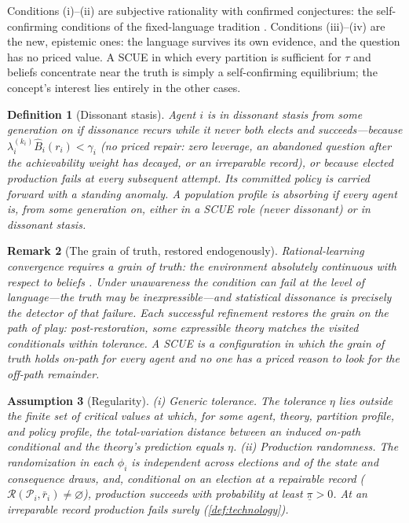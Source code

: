 \documentclass[11pt]{article}
\newtheorem{assumption}{Assumption}[section]
\newtheorem{definition}[assumption]{Definition}
\newtheorem{remark}[assumption]{Remark}
\theoremstyle{definition}
\newcommand{\emptysetset}{\varnothing}
\begin{document}
Conditions (i)--(ii) are subjective rationality with confirmed conjectures:
the self-confirming conditions of the fixed-language tradition
\citep{FudenbergLevine1993,KalaiLehrer1993b}.  Conditions (iii)--(iv) are the
new, epistemic ones: the language survives its own evidence, and the question
has no priced value.  A SCUE in which every partition is sufficient for $\tau$
and beliefs concentrate near the truth is simply a self-confirming
equilibrium; the concept's interest lies entirely in the other cases.

\begin{definition}[Dissonant stasis]
\label{def:stasis}
Agent $i$ is in \emph{dissonant stasis} from some generation on if dissonance
recurs while it never both elects and succeeds---because
$\lambda_i^{(k_i)}\widehat B_i(r_i)<\gamma_i$ (no priced repair: zero leverage,
an abandoned question after the achievability weight has decayed, or an
irreparable record), or because elected production fails at every subsequent
attempt.  Its committed policy is carried forward with a standing anomaly.  A
population profile is \emph{absorbing} if every agent is, from some generation
on, either in a SCUE role (never dissonant) or in dissonant stasis.
\end{definition}

\begin{remark}[The grain of truth, restored endogenously]
\label{rem:grain}
Rational-learning convergence requires a grain of truth: the environment
absolutely continuous with respect to beliefs \citep{KalaiLehrer1993a}.
Under unawareness the condition can fail at the level of language---the
truth may be inexpressible---and statistical dissonance is precisely the
detector of that failure.  Each successful refinement restores the grain
\emph{on the path of play}: post-restoration, some expressible theory
matches the visited conditionals within tolerance.  A SCUE is a
configuration in which the grain of truth holds on-path for every agent and
no one has a priced reason to look for the off-path remainder.
\end{remark}

\begin{assumption}[Regularity]
\label{ass:regularity}
(i) \emph{Generic tolerance.}  The tolerance $\eta$ lies outside the finite
set of critical values at which, for some agent, theory, partition profile,
and policy profile, the total-variation distance between an induced on-path
conditional and the theory's prediction equals $\eta$.
(ii) \emph{Production randomness.}  The randomization in each $\phi_i$ is
independent across elections and of the state and consequence draws, and,
conditional on an election at a \emph{repairable} record
($\mathcal R(\mathcal P_i,\bar r_i)\neq\emptysetset$), production succeeds with
probability at least $\underline\pi>0$.  At an irreparable record production
fails surely (\cref{def:technology}).
\end{assumption}
\end{document}

